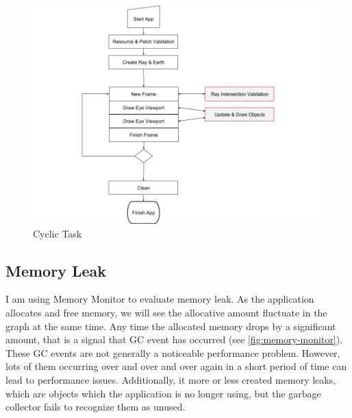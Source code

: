 \begin{figure}[H]
	\caption{Cyclic Task}
	\label{fig:cyclic-task}
	\centering
	\includegraphics[width=\textwidth, keepaspectratio]{Figures/cyclic-task.png}
	\decoRule
\end{figure}


\subsection{Memory Leak}

I am using Memory Monitor to evaluate memory leak. As the application allocates and free memory, we will see the allocative amount fluctuate in the graph at the same time. Any time the allocated memory drops by a significant amount, that is a signal that GC event has occurred (see \ref{fig:memory-monitor}). These GC events are not generally a noticeable performance problem. However, lots of them occurring over and over and over again in a short period of time can lead to performance issues. Additionally, it more or less created memory leaks, which are objects which the application is no longer using, but the garbage collector fails to recognize them as unused.

